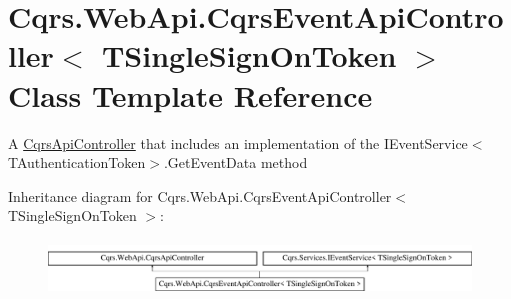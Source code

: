 \hypertarget{classCqrs_1_1WebApi_1_1CqrsEventApiController}{}\section{Cqrs.\+Web\+Api.\+Cqrs\+Event\+Api\+Controller$<$ T\+Single\+Sign\+On\+Token $>$ Class Template Reference}
\label{classCqrs_1_1WebApi_1_1CqrsEventApiController}


A \hyperlink{classCqrs_1_1WebApi_1_1CqrsApiController}{Cqrs\+Api\+Controller} that includes an implementation of the I\+Event\+Service$<$\+T\+Authentication\+Token$>$.\+Get\+Event\+Data method  


Inheritance diagram for Cqrs.\+Web\+Api.\+Cqrs\+Event\+Api\+Controller$<$ T\+Single\+Sign\+On\+Token $>$\+:\begin{figure}[H]
\begin{center}
\leavevmode
\includegraphics[height=1.501341cm]{classCqrs_1_1WebApi_1_1CqrsEventApiController}
\end{center}
\end{figure}

